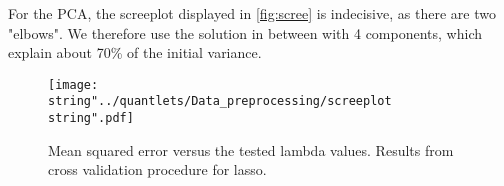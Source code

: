 For the PCA, the screeplot displayed in \autoref{fig:scree} is indecisive, as there are two "elbows".  We therefore use the solution in  between with 4 components, which explain about 70\% of the initial variance.  

\begin{figure}[H]
  \centering
\texttt{[image: \\string"../quantlets/Data\_preprocessing/screeplot\\string".pdf]}
  \caption{Mean squared error versus the tested lambda values. Results from cross validation procedure for lasso.}\label{fig:scree}
\end{figure}



 



